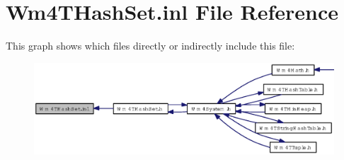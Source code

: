 \section{Wm4THash\-Set.inl File Reference}
\label{Wm4THashSet_8inl}


This graph shows which files directly or indirectly include this file:\begin{figure}[H]
\begin{center}
\leavevmode
\includegraphics[width=361pt]{Wm4THashSet_8inl__dep__incl}
\end{center}
\end{figure}
